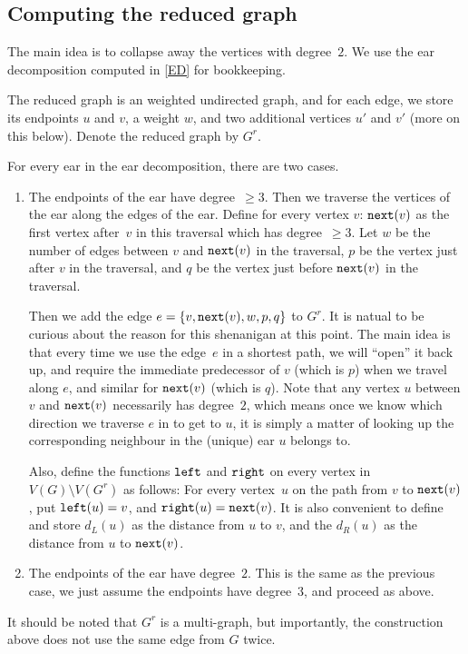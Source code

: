 \subsection{Computing the reduced graph}
The main idea is to collapse away the vertices with degree~$2$.
We use the ear decomposition computed in \ref{ED} for bookkeeping.

The reduced graph is an weighted undirected graph, and for each
edge, we store its endpoints $u$ and $v$, a weight $w$, and two additional
vertices $u'$ and $v'$ (more on this below).
Denote the reduced graph by $G^r$.

For every ear in the ear decomposition, there are two cases.
\begin{enumerate}[I]
	\item
		The endpoints of the ear have degree~$\geq 3$. Then we traverse the
		vertices of the ear along the edges of the ear. 
		Define for every vertex $v$: $\texttt{next}(v)$ as the first vertex
		after~$v$ in this traversal which has degree~$\geq 3$.
		Let $w$ be the number of edges between $v$ and $\texttt{next}(v)$ in
		the traversal, $p$ be the vertex just after $v$ in the traversal,
		and $q$ be the vertex just before $\texttt{next}(v)$ in the traversal.

		Then we add the edge $e = \left\{ v, \texttt{next}(v), w, p, q \right\}$
		to $G^r$.
		It is natual to be curious about the reason for this shenanigan
		at this point.
		The main idea is that every time we use the edge~$e$ in a
		shortest path, we will ``open'' it back up,
		and require the immediate predecessor of
		$v$ (which is $p$) when we travel along $e$, and similar for
		$\texttt{next}(v)$ (which is $q$).
		Note that any vertex $u$ between $v$ and $\texttt{next}(v)$
		necessarily has degree~$2$, which means once we know which direction
		we traverse $e$ in to get to $u$, it is simply a matter of looking
		up the corresponding neighbour in the (unique) ear $u$ belongs to.

		Also, define the functions $\texttt{left}$ and $\texttt{right}$ on
		every vertex in $V(G) \setminus V(G^r)$ as follows:
		For every vertex~$u$ on the path from $v$ to $\texttt{next}(v)$,
		put $\texttt{left}(u) = v$, and $\texttt{right}(u) = \texttt{next}(v)$.
		It is also convenient to define and store $d_L(u)$ as the distance
		from $u$ to $v$, and the $d_R(u)$ as the distance from $u$ to
		$\texttt{next}(v)$.
	\item
		The endpoints of the ear have degree~$2$.  This is the same as
		the previous case, we just assume the endpoints have degree~$3$,
		and proceed as above.
\end{enumerate}

It should be noted that $G^r$ is a multi-graph, but importantly, the
construction above does not use the same edge from $G$ twice.
